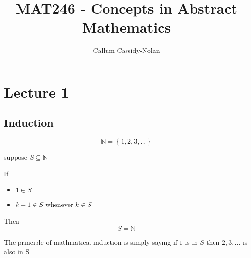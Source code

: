 \documentclass[11pt]{book}
\title{MAT246 - Concepts in Abstract Mathematics}
\author{Callum Cassidy-Nolan}
\begin{document}


\chapter{Lecture 1}%
\label{chp:lecture_1}

\section{Induction}%
\label{sec:induction}

\begin{nt}
    \[
    \mathbb{N} = \left\{ 1, 2, 3, \ldots  \right\} 
    \]
\end{nt}

\begin{defn}\label{defn:the_principle_of_mathmatical_induction_}
suppose $S \subseteq \mathbb{N} $  

If
\begin{itemize}
    \item $1\in S$ 
    \item $k + 1 \in S$ whenever $k \in S$ 
\end{itemize}
Then
\[
    \boxed{ S = \mathbb{N} }
\]

\end{defn}

The principle of mathmatical induction is simply saying if $1$ is in $S$ then $2, 3, \ldots $ is also in S
\end{document}
